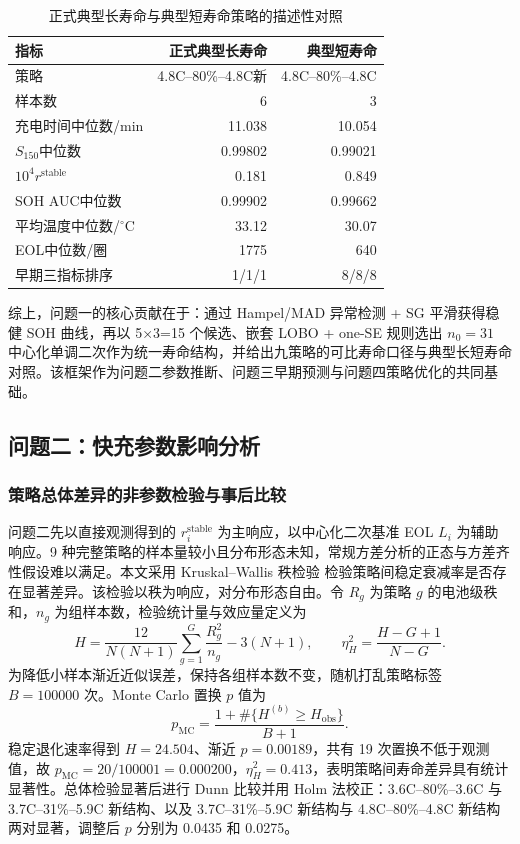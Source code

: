 \documentclass[withoutpreface]{cumcmthesis}
\begin{document}
\begin{table}[H]
\centering
\small
\caption{正式典型长寿命与典型短寿命策略的描述性对照}
\begin{tabular}{lrr}
\toprule
指标 & 正式典型长寿命 & 典型短寿命 \\
\midrule
策略 & 4.8C--80\%--4.8C新 & 4.8C--80\%--4.8C \\
样本数 & 6 & 3 \\
充电时间中位数/min & 11.038 & 10.054 \\
$S_{150}$中位数 & 0.99802 & 0.99021 \\
$10^4r^{\mathrm{stable}}$ & 0.181 & 0.849 \\
SOH AUC中位数 & 0.99902 & 0.99662 \\
平均温度中位数/$^\circ$C & 33.12 & 30.07 \\
EOL中位数/圈 & 1775 & 640 \\
早期三指标排序 & 1/1/1 & 8/8/8 \\
\bottomrule
\end{tabular}
\label{tab:longshortdetail}
\end{table}

综上，问题一的核心贡献在于：通过 Hampel/MAD 异常检测 + SG 平滑获得稳健 SOH 曲线，再以 5×3=15 个候选、嵌套 LOBO + one-SE 规则选出 $n_0=31$ 中心化单调二次作为统一寿命结构，并给出九策略的可比寿命口径与典型长短寿命对照。该框架作为问题二参数推断、问题三早期预测与问题四策略优化的共同基础。

\subsection{问题二：快充参数影响分析}

\subsubsection{策略总体差异的非参数检验与事后比较}

问题二先以直接观测得到的 $r_i^{\mathrm{stable}}$ 为主响应，以中心化二次基准 EOL $L_i$ 为辅助响应。9 种完整策略的样本量较小且分布形态未知，常规方差分析的正态与方差齐性假设难以满足。本文采用 Kruskal--Wallis 秩检验\cite{kruskal1952} 检验策略间稳定衰减率是否存在显著差异。该检验以秩为响应，对分布形态自由。令 $R_g$ 为策略 $g$ 的电池级秩和，$n_g$ 为组样本数，检验统计量与效应量定义为
\begin{equation}
H=\frac{12}{N(N+1)}\sum_{g=1}^{G}\frac{R_g^2}{n_g}-3(N+1),
\qquad
\eta_H^2=\frac{H-G+1}{N-G}.
\end{equation}
为降低小样本渐近近似误差，保持各组样本数不变，随机打乱策略标签 $B=100000$ 次。Monte Carlo 置换 $p$ 值为
\begin{equation}
p_{\mathrm{MC}}
=\frac{1+\#\{H^{(b)}\ge H_{\mathrm{obs}}\}}{B+1}.
\end{equation}
稳定退化速率得到 $H=24.504$、渐近 $p=0.00189$，共有 19 次置换不低于观测值，故 $p_{\mathrm{MC}}=20/100001=0.000200$，$\eta_H^2=0.413$，表明策略间寿命差异具有统计显著性。总体检验显著后进行 Dunn 比较\cite{dunn1964}并用 Holm 法\cite{holm1979}校正：3.6C--80\%--3.6C 与 3.7C--31\%--5.9C 新结构、以及 3.7C--31\%--5.9C 新结构与 4.8C--80\%--4.8C 新结构两对显著，调整后 $p$ 分别为 0.0435 和 0.0275。
\end{document}
